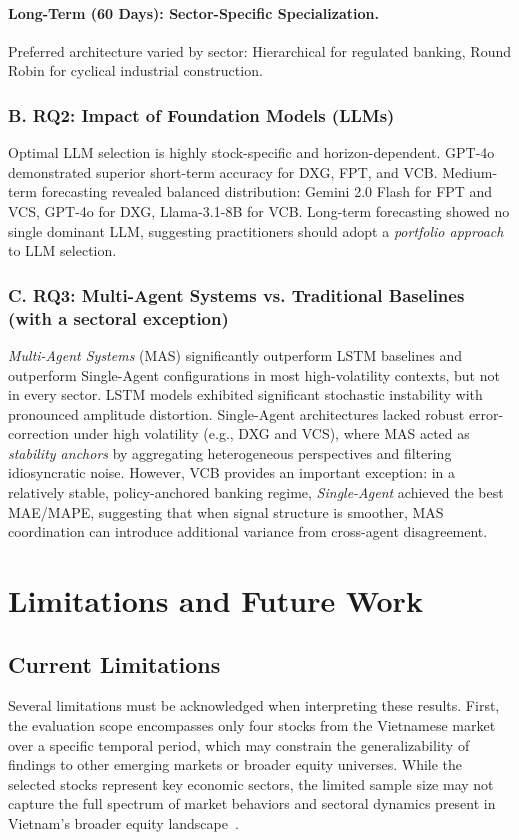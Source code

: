 \documentclass{ieeeaccess}
\begin{document}
\paragraph{Long-Term (60 Days): Sector-Specific Specialization.}
Preferred architecture varied by sector: Hierarchical for regulated banking, Round Robin for cyclical industrial construction.

\subsubsection{B. RQ2: Impact of Foundation Models (LLMs)}
Optimal LLM selection is highly stock-specific and horizon-dependent. GPT-4o demonstrated superior short-term accuracy for DXG, FPT, and VCB. Medium-term forecasting revealed balanced distribution: Gemini 2.0 Flash for FPT and VCS, GPT-4o for DXG, Llama-3.1-8B for VCB. Long-term forecasting showed no single dominant LLM, suggesting practitioners should adopt a \textit{portfolio approach} to LLM selection.

\subsubsection{C. RQ3: Multi-Agent Systems vs. Traditional Baselines (with a sectoral exception)}
\textit{Multi-Agent Systems} (MAS) significantly outperform LSTM baselines and outperform Single-Agent configurations in most high-volatility contexts, but not in every sector. LSTM models exhibited significant stochastic instability with pronounced amplitude distortion. Single-Agent architectures lacked robust error-correction under high volatility (e.g., DXG and VCS), where MAS acted as \textit{stability anchors} by aggregating heterogeneous perspectives and filtering idiosyncratic noise. However, VCB provides an important exception: in a relatively stable, policy-anchored banking regime, \textit{Single-Agent} achieved the best MAE/MAPE, suggesting that when signal structure is smoother, MAS coordination can introduce additional variance from cross-agent disagreement.





\section{Limitations and Future Work}
\subsection{Current Limitations}
Several limitations must be acknowledged when interpreting these results. First, the evaluation scope encompasses only four stocks from the Vietnamese market over a specific temporal period, which may constrain the generalizability of findings to other emerging markets or broader equity universes. While the selected stocks represent key economic sectors, the limited sample size may not capture the full spectrum of market behaviors and sectoral dynamics present in Vietnam's broader equity landscape~\cite{phan2015stock}.
\end{document}
